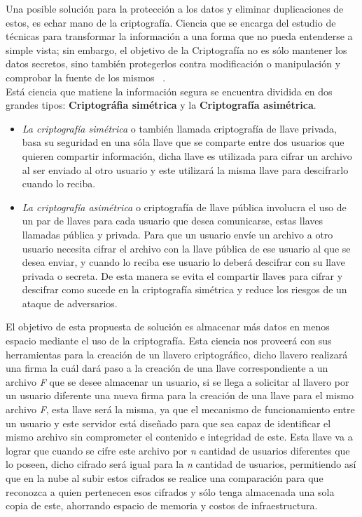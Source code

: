 Una posible solución para la protección a los datos y eliminar duplicaciones de estos, es echar mano de la criptografía. Ciencia que se encarga del estudio de técnicas para transformar la información a una forma que no pueda entenderse a simple vista; sin embargo, el objetivo de la Criptografía no es sólo mantener los datos secretos, sino también protegerlos contra modificación o manipulación y comprobar la fuente de los mismos ~\cite{fundamentos}. \\   
Está ciencia que matiene la información segura se encuentra dividida en dos grandes tipos: \textbf{Criptográfia simétrica} y la \textbf{Criptografía asimétrica}.  
\begin{itemize} 
   \item \textit{La criptografía simétrica} o también llamada criptografía de llave privada, basa su seguridad en una sóla llave que se comparte entre dos usuarios que quieren compartir información, dicha llave es utilizada para cifrar un archivo al ser enviado al otro usuario y este utilizará la misma llave para descifrarlo cuando lo reciba. 
\item \textit{La criptografía asimétrica} o criptografía de llave pública involucra el uso de un par de llaves para cada usuario que desea comunicarse, estas llaves llamadas pública y privada. Para que un usuario envíe un archivo a otro usuario necesita cifrar el archivo con la llave pública de ese usuario al que se desea enviar, y cuando lo reciba ese usuario lo deberá descifrar con su llave privada o secreta. De esta manera se evita el compartir llaves para cifrar y descifrar como sucede en la criptografía simétrica y reduce los riesgos de un ataque de adversarios. 
 \end{itemize}

El objetivo de esta propuesta de solución es almacenar más datos en menos espacio mediante el uso de la criptografía. Esta ciencia nos proveerá con sus herramientas para la creación de un llavero criptográfico, dicho llavero realizará una firma la cuál dará paso a la creación de una llave correspondiente a un archivo \textit{F} que se desee almacenar un usuario, si se llega a solicitar al llavero por un usuario diferente una nueva firma para la creación de una llave para el mismo archivo \textit{F}, esta llave será la misma, ya que el mecanismo de funcionamiento entre un usuario y este servidor está diseñado para que sea capaz de identificar el mismo archivo sin comprometer el contenido e integridad de este. Esta  llave va a lograr que cuando se cifre este archivo por \textit{n} cantidad de usuarios diferentes que lo poseen, dicho cifrado será igual para la \textit{n} cantidad de usuarios, permitiendo así que en la nube al subir estos cifrados se realice una comparación para que reconozca a quien pertenecen esos cifrados y sólo tenga almacenada una sola copia de este, ahorrando espacio de memoria y costos de infraestructura. 

